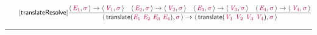 \documentclass[10pt,leqno,fleqn]{article}
\newcommand{\artVariable}[1]{\mbox{\color{purple}\em #1\/}}
\newcommand{\artConstructor}[1]{\mbox{\sf #1}}
\begin{document}
\begin{equation}
\tag*{[\artConstructor{\sf translateResolve}]}
\begin{split}\frac{\langle\, \artVariable{E$_{1}$}, \artVariable{$\sigma$}\,\rangle \rightarrow \langle\, \artVariable{V$_{1}$}, \artVariable{$\sigma$}\,\rangle \quad \langle\, \artVariable{E$_{2}$}, \artVariable{$\sigma$}\,\rangle \rightarrow \langle\, \artVariable{V$_{2}$}, \artVariable{$\sigma$}\,\rangle \quad \langle\, \artVariable{E$_{3}$}, \artVariable{$\sigma$}\,\rangle \rightarrow \langle\, \artVariable{V$_{3}$}, \artVariable{$\sigma$}\,\rangle \quad \langle\, \artVariable{E$_{4}$}, \artVariable{$\sigma$}\,\rangle \rightarrow \langle\, \artVariable{V$_{4}$}, \artVariable{$\sigma$}\,\rangle }{\langle\, \artConstructor{\sf translate}(\artVariable{E$_{1}$}\ \artVariable{E$_{2}$}\ \artVariable{E$_{3}$}\ \artVariable{E$_{4}$}), \artVariable{$\sigma$}\,\rangle \rightarrow \langle\, \artConstructor{\sf translate}(\artVariable{V$_{1}$}\ \artVariable{V$_{2}$}\ \artVariable{V$_{3}$}\ \artVariable{V$_{4}$}), \artVariable{$\sigma$}\,\rangle }
\end{split}
\end{equation}

\hrule
\end{document}
